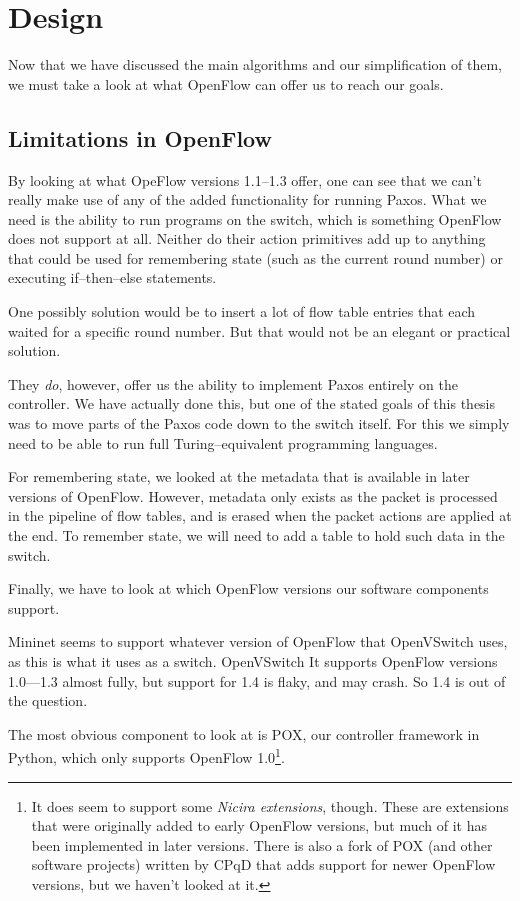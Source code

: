 \chapter{Design}

Now that we have discussed the main algorithms and our simplification of
them, we must take a look at what OpenFlow can offer us to reach our goals.



\section{Limitations in OpenFlow}

By looking at what OpeFlow versions 1.1--1.3 offer, one can see that we can't really
make use of any of the added functionality for running Paxos.  What we need
is the ability to run programs on the switch, which is something OpenFlow
does not support at all.  Neither do their action primitives add up to
anything that could be used for remembering state (such as the current round
number) or executing if--then--else statements.

One possibly solution would be to insert a lot of flow table entries that
each waited for a specific round number.  But that would not be an elegant
or practical solution.

They \textit{do}, however, offer us the ability to implement Paxos entirely
on the controller.  We have actually done this, but one of the stated goals
of this thesis was to move parts of the Paxos code down to the switch
itself.  For this we simply need to be able to run full Turing--equivalent
programming languages.

For remembering state, we looked at the metadata that is available in later
versions of OpenFlow.  However, metadata only exists as the packet is
processed in the pipeline of flow tables, and is erased when the packet
actions are applied at the end.  To remember state, we will need to add a
table to hold such data in the switch.

Finally, we have to look at which OpenFlow versions our software components
support.

Mininet seems to support whatever version of OpenFlow that OpenVSwitch uses,
as this is what it uses as a switch.  OpenVSwitch It supports OpenFlow versions
1.0---1.3 almost fully, but support for 1.4 is flaky, and may crash.  So 1.4
is out of the question.

The most obvious component to look at is POX, our controller
framework in Python, which only supports OpenFlow 1.0\footnote{It does seem
to support some \textit{Nicira extensions}, though.  These are extensions
that were originally added to early OpenFlow versions, but much of it
has been implemented in later versions.  There is also a fork of POX (and other
software projects) written by CPqD that adds support for newer OpenFlow
versions, but we haven't looked at it.}.

